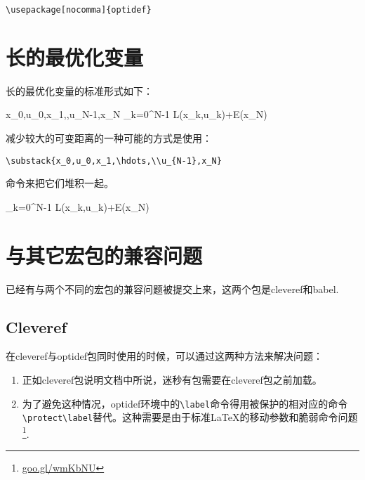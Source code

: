 \documentclass[UTF8]{ctexart}
\begin{document}
\begin{verbatim}
\usepackage[nocomma]{optidef}
\end{verbatim}

\section{长的最优化变量}
长的最优化变量的标准形式如下：

\begin{mini!}
	{x_0,u_0,x_1,\hdots,u_{N-1},x_N}
	{\sum_{k=0}^{N-1} L(x_k,u_k)\!\!+\!\!E(x_N)\label{OCPobj}}
	{\label{eq:OCP}}{}
\end{mini!}

\noindent 减少较大的可变距离的一种可能的方式是使用：\begin{verbatim}
\substack{x_0,u_0,x_1,\hdots,\\u_{N-1},x_N}
\end{verbatim}
命令来把它们堆积一起。

\begin{mini!}
	{}
	{\sum_{k=0}^{N-1} L(x_k,u_k)\!\!+\!\!E(x_N)\label{OCPobj}}
	{\label{eq:OCP}}{}
\end{mini!}

\section{与其它宏包的兼容问题}
已经有与两个不同的宏包的兼容问题被提交上来，这两个包是cleveref和babel.
\subsection{Cleveref}
在cleveref与optidef包同时使用的时候，可以通过这两种方法来解决问题：

\begin{enumerate}
	\item 正如cleveref包说明文档中所说，迷秒有包需要在cleveref包之前加载。
	\item 为了避免这种情况，optidef环境中的\verb|\label|命令得用被保护的相对应的命令\verb|\protect\label|替代。这种需要是由于标准\LaTeX{}的移动参数和脆弱命令问题\footnote{\url{goo.gl/wmKbNU}}.
\end{enumerate} 
\end{document}
